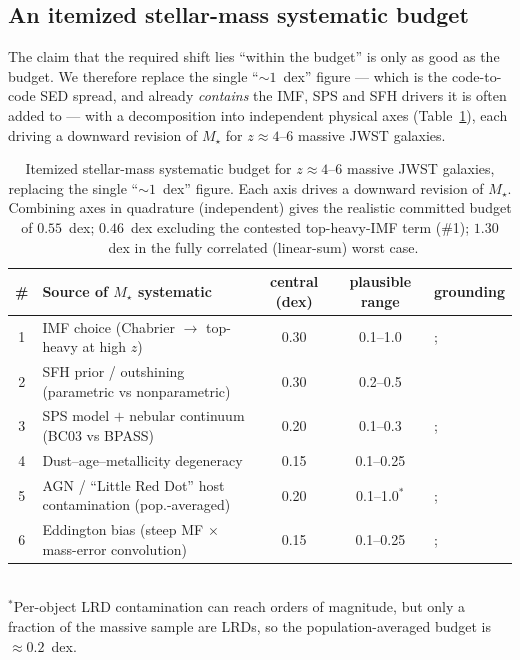 \documentclass[twocolumn]{aastex631}
\begin{document}
\subsection{An itemized stellar-mass systematic budget}
The claim that the required shift lies ``within the budget'' is only as good as the budget. We
therefore replace the single ``$\sim1$~dex'' figure --- which is the code-to-code SED spread, and
already \emph{contains} the IMF, SPS and SFH drivers it is often added to --- with a decomposition
into independent physical axes (Table~\ref{tab:budget}), each driving a downward revision of
$M_\star$ for $z\approx4$--6 massive JWST galaxies.

\begin{table}[htb]
\centering
\caption{Itemized stellar-mass systematic budget for $z\approx4$--6 massive JWST galaxies, replacing
the single ``$\sim1$~dex'' figure. Each axis drives a downward revision of $M_\star$. Combining axes
in quadrature (independent) gives the realistic committed budget of $0.55$~dex; $0.46$~dex excluding
the contested top-heavy-IMF term (\#1); $1.30$~dex in the fully correlated (linear-sum) worst
case.\label{tab:budget}}
\begin{tabular}{clccl}
\hline
\# & Source of $M_\star$ systematic & central (dex) & plausible range & grounding \\
\hline
1 & IMF choice (Chabrier $\to$ top-heavy at high $z$)          & 0.30 & 0.1--1.0  & \citet{lapi24}; \citet{steinhardt23} \\
2 & SFH prior / outshining (parametric vs nonparametric)       & 0.30 & 0.2--0.5  & \citet{harvey25} \\
3 & SPS model $+$ nebular continuum (BC03 vs BPASS)            & 0.20 & 0.1--0.3  & \citet{choe26}; \citet{cochrane25} \\
4 & Dust--age--metallicity degeneracy                          & 0.15 & 0.1--0.25 & \citet{choe26} \\
5 & AGN / ``Little Red Dot'' host contamination (pop.-averaged) & 0.20 & 0.1--1.0$^{\ast}$ & \citet{zhuang26}; \citet{kocevski25} \\
6 & Eddington bias (steep MF $\times$ mass-error convolution)  & 0.15 & 0.1--0.25 & \citet{adams23}; \citet{grazian15} \\
\hline
\end{tabular}\\[2pt]
{\footnotesize $^{\ast}$Per-object LRD contamination can reach orders of magnitude, but only a
fraction of the massive sample are LRDs, so the population-averaged budget is $\approx0.2$~dex.}
\end{table}
\end{document}
